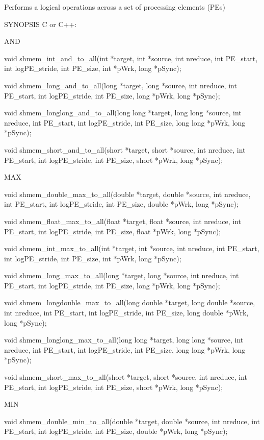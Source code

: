        Performs a logical operations across a set of processing elements (PEs)

SYNOPSIS
       C or C++:
       
          AND

	  void shmem_int_and_to_all(int *target, int *source, int nreduce, int
	  PE_start, int logPE_stride, int PE_size, int *pWrk, long *pSync);

	  void	shmem_long_and_to_all(long *target, long *source, int nreduce,
	  int PE_start,	 int  logPE_stride,  int  PE_size,  long  *pWrk,  long
	  *pSync);

	  void shmem_longlong_and_to_all(long long *target, long long *source,
	  int nreduce, int PE_start, int logPE_stride, int PE_size, long  long
	  *pWrk, long *pSync);

	  void	 shmem_short_and_to_all(short	*target,  short	 *source,  int
	  nreduce, int PE_start, int logPE_stride, int PE_size,	 short	*pWrk,
	  long *pSync);
	  
	  MAX
	  
	  void shmem_double_max_to_all(double  *target,	 double	 *source,  int
	  nreduce,  int PE_start, int logPE_stride, int PE_size, double *pWrk,
	  long *pSync);

	  void	shmem_float_max_to_all(float  *target,	float	*source,   int
	  nreduce,  int	 PE_start, int logPE_stride, int PE_size, float *pWrk,
	  long *pSync);

	  void shmem_int_max_to_all(int *target, int *source, int nreduce, int
	  PE_start, int logPE_stride, int PE_size, int *pWrk, long *pSync);

	  void	shmem_long_max_to_all(long *target, long *source, int nreduce,
	  int PE_start,	 int  logPE_stride,  int  PE_size,  long  *pWrk,  long
	  *pSync);

	  void	shmem_longdouble_max_to_all(long  double  *target, long double
	  *source, int nreduce, int PE_start, int logPE_stride,	 int  PE_size,
	  long double *pWrk, long *pSync);

	  void shmem_longlong_max_to_all(long long *target, long long *source,
	  int nreduce, int PE_start, int logPE_stride, int PE_size, long  long
	  *pWrk, long *pSync);

	  void	 shmem_short_max_to_all(short	*target,  short	 *source,  int
	  nreduce, int PE_start, int logPE_stride, int PE_size,	 short	*pWrk,
	  long *pSync);
	  
	  MIN
	  
	  void shmem_double_min_to_all(double  *target,	 double	 *source,  int
	  nreduce,  int PE_start, int logPE_stride, int PE_size, double *pWrk,
	  long *pSync);

